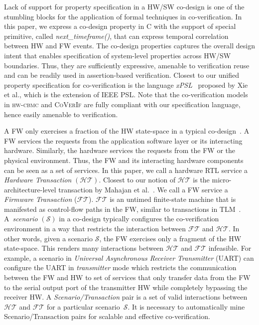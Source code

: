 \documentclass[sigconf]{acmart}
\newcommand{\tool}[1]{\textsc{#1}\xspace}
\newcommand{\hwcbmcv}{\tool{hw-cbmc}}
\newcommand{\verifox}{\tool{CoVerIf}}
\begin{document}
Lack of support for property specification in a HW/SW co-design is one of the
stumbling blocks for the application of formal techniques in co-verification.  
In this paper, we express a co-design property in C 
with the support of special primitive, called {\em next\_timeframe()}, 
that can express temporal correlation between HW and FW events. 
The co-design properties captures the overall design intent that enables
specification of system-level properties across HW/SW boundaries. Thus, 
they are sufficiently expressive, amenable to verification reuse and can be 
readily used in assertion-based verification.  Closest to our
unified property specification for co-verification is the language
\textit{xPSL}~\cite{xPSL} proposed by Xie et al., which is the extension of IEEE PSL.  
Note that the co-verification models in \hwcbmcv and \verifox are fully compliant 
with our specification language, hence easily amenable to verification.
%


A FW only exercises a fraction of the HW state-space in a typical 
co-design~\cite{polig2014micro,polig2014fpl,giefers2015accelerating}.  
A FW services the requests from the application software 
layer or its interacting hardware.  Similarly, the hardware services 
the requests from the FW or the
physical environment.  Thus, the FW and its interacting hardware
components can be seen as a set of services.  In this paper, we call a
hardware RTL service a {\em Hardware Transaction} $(\mathcal{HT})$.  Closest
to our notion of $\mathcal{HT}$ is the micro-architecture-level transaction
by Mahajan et al.~\cite{mcbmq}.  We call a FW service a {\em Firmware
Transaction} ($\mathcal{FT}$).  $\mathcal{FT}$ is an untimed finite-state
machine that is manifested as control-flow paths in the FW, similar to
transactions in TLM~\cite{codes14}.  A~{\em scenario} $(\mathcal{S})$ in a
co-design typically configures the co-verification environment in a way that
restricts the interaction between $\mathcal{FT}$ and $\mathcal{HT}$.  In
other words, given a scenario $\mathcal{S}$, the FW exercises only a fragment
of the HW state-space.  This renders many interactions between
$\mathcal{HT}$ and $\mathcal{FT}$ infeasible. For example, a scenario in 
\emph{Universal Asynchronous Receiver Transmitter} (UART)  can configure the 
UART in \emph{transmitter} mode which restricts the communication between the FW 
and HW to set of services that only transfer data from the FW to the serial output 
port of the transmitter HW while completely bypassing the receiver HW.  
A {\em Scenario/Transaction} pair is a set of valid interactions between 
$\mathcal{HT}$ and $\mathcal{FT}$ for a particular scenario~$\mathcal{S}$.  
It is necessary to automatically mine Scenario/Transaction pairs for scalable 
and effective co-verification.
\end{document}
